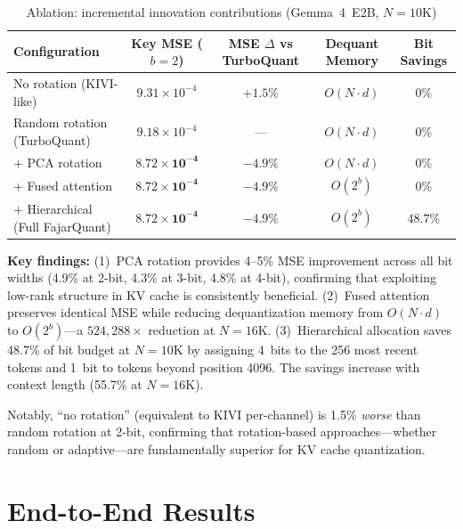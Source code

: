 \documentclass{article}
\begin{document}
\begin{table}[t]
\centering
\small
\caption{Ablation: incremental innovation contributions (Gemma~4~E2B, $N{=}10$K)}
\label{tab:ablation}
\begin{tabular}{lcccc}
\toprule
Configuration & Key MSE ($b{=}2$) & MSE $\Delta$ vs TurboQuant & Dequant Memory & Bit Savings \\
\midrule
No rotation (KIVI-like) & $9.31 \times 10^{-4}$ & $+1.5\%$ & $O(N \cdot d)$ & 0\% \\
Random rotation (TurboQuant) & $9.18 \times 10^{-4}$ & --- & $O(N \cdot d)$ & 0\% \\
\midrule
$+$ PCA rotation & $\mathbf{8.72 \times 10^{-4}}$ & $-4.9\%$ & $O(N \cdot d)$ & 0\% \\
$+$ Fused attention & $\mathbf{8.72 \times 10^{-4}}$ & $-4.9\%$ & $O(2^b)$ & 0\% \\
$+$ Hierarchical (Full FajarQuant) & $\mathbf{8.72 \times 10^{-4}}$ & $-4.9\%$ & $O(2^b)$ & $48.7\%$ \\
\bottomrule
\end{tabular}
\end{table}

\textbf{Key findings:} (1)~PCA rotation provides 4--5\% MSE improvement across all bit widths (4.9\% at 2-bit, 4.3\% at 3-bit, 4.8\% at 4-bit), confirming that exploiting low-rank structure in KV cache is consistently beneficial. (2)~Fused attention preserves identical MSE while reducing dequantization memory from $O(N \!\cdot\! d)$ to $O(2^b)$---a $524{,}288\times$ reduction at $N{=}16$K. (3)~Hierarchical allocation saves 48.7\% of bit budget at $N{=}10$K by assigning 4~bits to the 256 most recent tokens and 1~bit to tokens beyond position 4096. The savings increase with context length (55.7\% at $N{=}16$K).

Notably, ``no rotation'' (equivalent to KIVI per-channel) is 1.5\% \textit{worse} than random rotation at 2-bit, confirming that rotation-based approaches---whether random or adaptive---are fundamentally superior for KV cache quantization.

\section{End-to-End Results}
\end{document}
